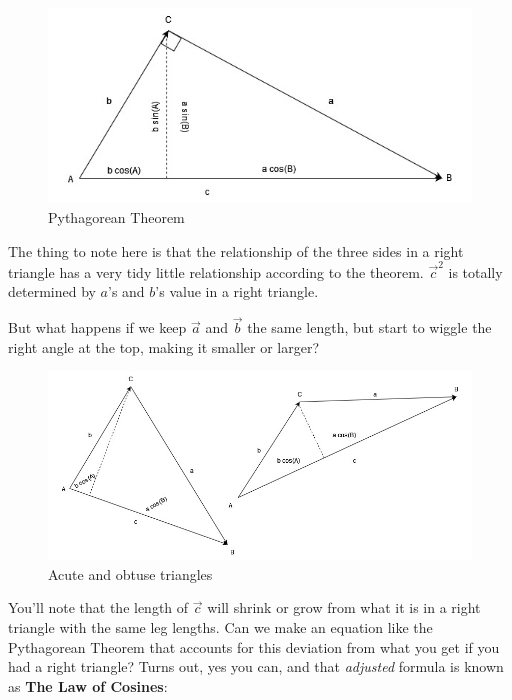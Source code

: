 \documentclass[
]{book}
\begin{document}
\begin{figure}

{\centering \includegraphics[width=0.75\linewidth,height=0.75\textheight]{images/LofC-PythThm} 

}

\caption{Pythagorean Theorem}\label{fig:unnamed-chunk-8}
\end{figure}

The thing to note here is that the relationship of the three sides in a right triangle has a very tidy little relationship according to the theorem. \(\vec{c}^2\) is totally determined by \(a\)'s and \(b\)'s value in a right triangle.

But what happens if we keep \(\vec{a}\) and \(\vec{b}\) the same length, but start to wiggle the right angle at the top, making it smaller or larger?

\begin{figure}

{\centering \includegraphics[width=0.75\linewidth,height=0.75\textheight]{images/LofC-acute-obtuse} 

}

\caption{Acute and obtuse triangles}\label{fig:unnamed-chunk-9}
\end{figure}

You'll note that the length of \(\vec{c}\) will shrink or grow from what it is in a right triangle with the same leg lengths. Can we make an equation like the Pythagorean Theorem that accounts for this deviation from what you get if you had a right triangle? Turns out, yes you can, and that \emph{adjusted} formula is known as \textbf{The Law of Cosines}:
\end{document}
